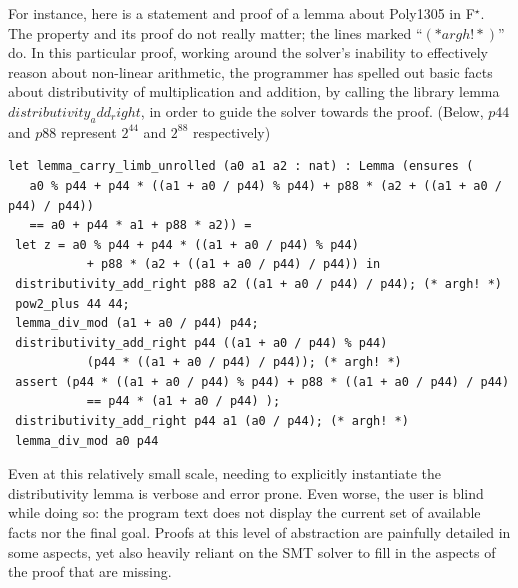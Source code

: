 \documentclass[runningheads]{llncs}
\newcommand\fstar{F$^\star$\xspace}
\newcommand{\comm}[3]{\ifcheckpagebudget\else\ifdraft{{\color{#1}[#2: #3]}}\fi\fi}
\newcommand{\aseem}[1]{\comm{magenta}{Aseem}{#1}}
\newcommand{\guido}[1]{\comm{blue}{Guido}{#1}}
\begin{document}
For instance, here is a statement and proof of a lemma about Poly1305
in \fstar. The property and its proof do not really
matter; the lines marked ``\ls$(* argh! *)$'' do. In this particular proof,
working around the solver's inability to effectively reason about
non-linear arithmetic, the programmer has spelled out basic facts about
distributivity of multiplication and addition, by calling the library
lemma \ls$distributivity_add_right$, in order to guide
the solver towards the proof.
(Below, \ls$p44$ and \ls$p88$ represent $2^{44}$ and $2^{88}$ respectively)
%
\begin{lstlisting}
let lemma_carry_limb_unrolled (a0 a1 a2 : nat) : Lemma (ensures (
   a0 % p44 + p44 * ((a1 + a0 / p44) % p44) + p88 * (a2 + ((a1 + a0 / p44) / p44))
   == a0 + p44 * a1 + p88 * a2)) =
 let z = a0 % p44 + p44 * ((a1 + a0 / p44) % p44)
           + p88 * (a2 + ((a1 + a0 / p44) / p44)) in
 distributivity_add_right p88 a2 ((a1 + a0 / p44) / p44); (* argh! *)
 pow2_plus 44 44;
 lemma_div_mod (a1 + a0 / p44) p44;
 distributivity_add_right p44 ((a1 + a0 / p44) % p44)
           (p44 * ((a1 + a0 / p44) / p44)); (* argh! *)
 assert (p44 * ((a1 + a0 / p44) % p44) + p88 * ((a1 + a0 / p44) / p44)
           == p44 * (a1 + a0 / p44) );
 distributivity_add_right p44 a1 (a0 / p44); (* argh! *)
 lemma_div_mod a0 p44
\end{lstlisting}
%
Even at this relatively small scale, needing to explicitly instantiate
the distributivity lemma is verbose and error prone.
%
Even worse, the user is blind while doing so: the
program text does not display the current set of available facts nor
the final goal.
%
Proofs at this level of abstraction are painfully detailed in some
aspects, yet also heavily reliant on the SMT solver to fill in the aspects of
the proof that are missing.
%
%
\end{document}
